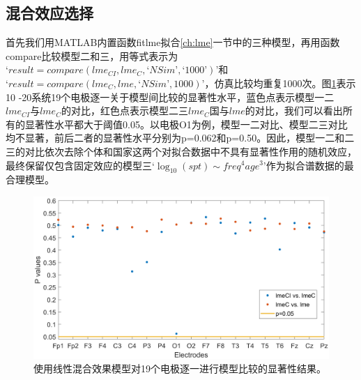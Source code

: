 \subsection{混合效应选择}
首先我们用MATLAB内置函数fitlme拟合\ref{ch:lme}一节中的三种模型，再用函数compare比较模型二和三，用等式表示为$‘result = compare(lme_{CI}, lme_C, ‘NSim’, ‘1000’)’$和$‘result = compare (lme_C, lme, ‘NSim’, 1000)’$，仿真比较均重复1000次。图\ref{pv}表示10
-20系统19个电极逐一关于模型间比较的显著性水平，蓝色点表示模型一二$lme_{CI}$与$lme_C$的对比，红色点表示模型二三$lme_C$国与$lme$的对比，我们可以看出所有的显著性水平都大于阈值0.05。以电极O1为例，模型一二对比、模型二三对比均不显著，前后二者的显著性水平分别为p=0.062和p=0.50。因此，模型一二和二三的对比依次去除个体和国家这两个对拟合数据中不具有显著性作用的随机效应，最终保留仅包含固定效应的模型三$‘\log_{10}(spt)\sim{freq^4age^3}’$作为拟合谱数据的最合理模型。
\begin{figure}[!ht]
\includegraphics[width=15cm]{pic/Norm/figure5.png}
\caption{使用线性混合效果模型对19个电极逐一进行模型比较的显著性结果。}
\label{pv}
\end{figure}

